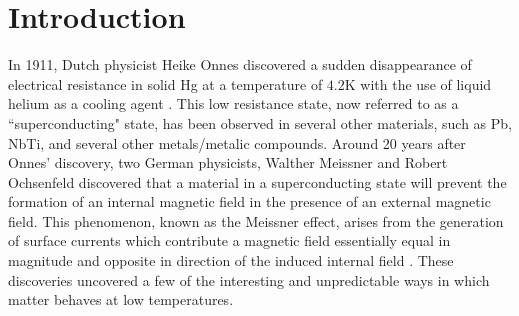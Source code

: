 \documentclass[prl,twocolumn,superscriptaddress,floatfix]{revtex4}
\begin{document}



\section{Introduction}
In 1911, Dutch physicist Heike Onnes discovered a sudden disappearance of electrical resistance in solid Hg at a temperature of $4.2\text{K}$ with the use of liquid helium as a cooling agent \cite{Van_Delft2010-ra}. This low resistance state, now referred to as a ``superconducting" state, has been observed in several other materials, such as Pb, NbTi, and several other metals/metalic compounds. Around 20 years after Onnes' discovery, two German physicists, Walther Meissner and Robert Ochsenfeld discovered that a material in a superconducting state will prevent the formation of an internal magnetic field in the presence of an external magnetic field. This phenomenon, known as the Meissner effect, arises from the generation of surface currents which contribute a magnetic field essentially equal in magnitude and opposite in direction of the induced internal field \cite{Kittle}. These discoveries uncovered a few of the interesting and unpredictable ways in which matter behaves at low temperatures.
\end{document}
